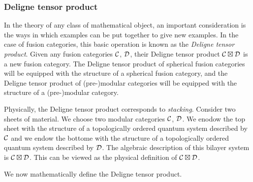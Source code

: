 
\subsubsection{Deligne tensor product}

In the theory of any class of mathematical object, an important consideration is the ways in which examples can be put together to give new examples. In the case of fusion categories, this basic operation is known as the \textit{Deligne tensor product}. Given any fusion categories ${\mathcal C}$, ${\mathcal D}$, their Deligne tensor product ${\mathcal C}\boxtimes {\mathcal D}$ is a new fusion category. The Deligne tensor product of spherical fusion categories will be equipped with the structure of a spherical fusion category, and the Deligne tensor product of (pre-)modular categories will be equipped with the structure of a (pre-)modular category.

Physically, the Deligne tensor product corresponds to \textit{stacking}. Consider two sheets of material. We choose two modular categories ${\mathcal C}$, ${\mathcal D}$. We enodow the top sheet with the structure of a topologically ordered quantum system described by ${\mathcal C}$ and we endow the bottome with the structure of a topologically ordered quantum system described by ${\mathcal D}$. The algebraic description of this bilayer system is ${\mathcal C}\boxtimes {\mathcal D}$. This can be viewed as the physical definition of ${\mathcal C}\boxtimes {\mathcal D}$.


We now mathematically define the Deligne tensor product.

